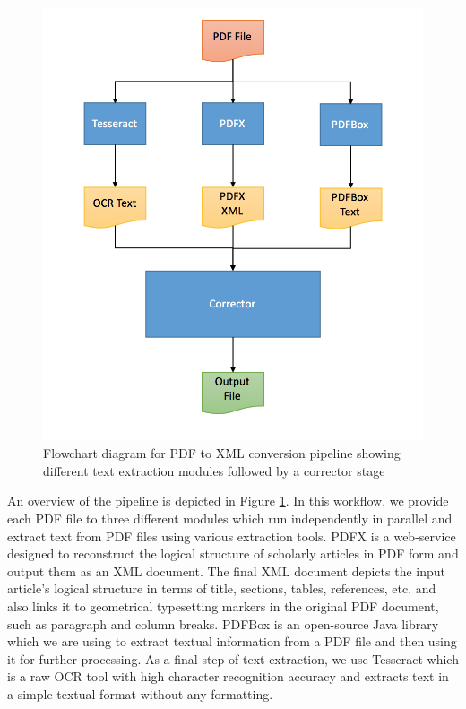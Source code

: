 \begin{figure}[!ht]
    \centering
    \includegraphics[height=0.55\textheight]{Images/BioPDFx-Flowchart.png}
    \caption{Flowchart diagram for PDF to XML conversion pipeline showing different text extraction modules followed by a corrector stage}
    \label{figure:biopdfx-flowchart}
    \vspace{0.1in}
\end{figure}

An overview of the pipeline is depicted in Figure \ref{figure:biopdfx-flowchart}. In this workflow, we provide each PDF file to three different modules which run independently in parallel and extract text from PDF files using various extraction tools. PDFX is a web-service designed to reconstruct the logical structure of scholarly articles in PDF form and output them as an XML document. The final XML document depicts the input article's logical structure in terms of title, sections, tables, references, etc. and also links it to geometrical typesetting markers in the original PDF document, such as paragraph and column breaks. PDFBox is an open-source Java library which we are using to extract textual information from a PDF file and then using it for further processing. As a final step of text extraction, we use Tesseract which is a raw OCR tool with high character recognition accuracy and extracts text in a simple textual format without any formatting.

